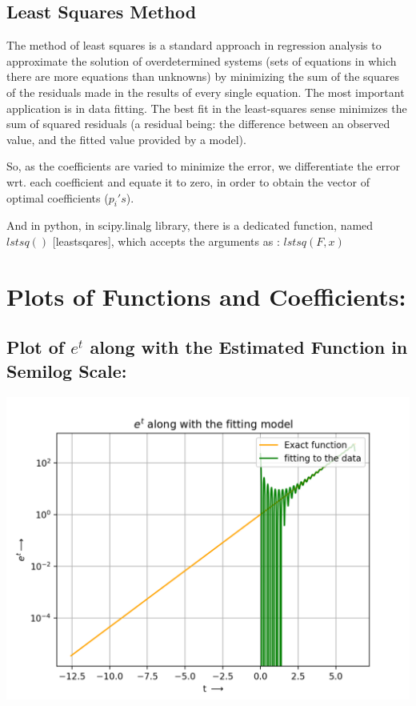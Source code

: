 \documentclass[10pt,english, openany]{book}
\begin{document}
    
\subsection{Least Squares Method}
The method of least squares is a standard approach in regression analysis to approximate the solution of overdetermined systems (sets of equations in which there are more equations than unknowns) by minimizing the sum of the squares of the residuals made in the results of every single equation.
The most important application is in data fitting. The best fit in the least-squares sense minimizes the sum of squared residuals (a residual being: the difference between an observed value, and the fitted value provided by a model).\par
So, as the coefficients are varied to minimize the error, we differentiate the error wrt. each coefficient and equate it to zero, in order to obtain the vector of optimal coefficients ($p_i 's$).\par
And in python, in scipy.linalg library, there is a dedicated function, named $lstsq()$ [leastsqares], which accepts the arguments as : $lstsq(F,x)$

\section{Plots of Functions and Coefficients:}

\subsection{Plot of $e^t$ along with the Estimated Function in Semilog Scale:}
{\centering\includegraphics[scale=0.7]{Figure_1.png}}
\end{document}

